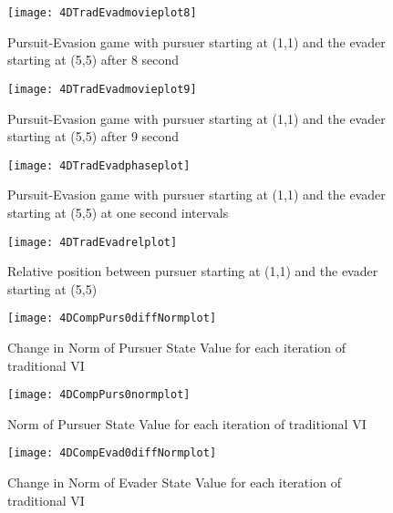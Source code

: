 \begin{figure}
\vspace{2.4in}
\centering
\texttt{[image: 4DTradEvadmovieplot8]}
\caption{Pursuit-Evasion game with pursuer starting at (1,1) and the evader starting at (5,5) after 8 second}
\label{4DTradEvadmovieplot8}
\end{figure}
\clearpage
\newpage

\begin{figure}
\vspace{2.4in}
\centering
\texttt{[image: 4DTradEvadmovieplot9]}
\caption{Pursuit-Evasion game with pursuer starting at (1,1) and the evader starting at (5,5) after 9 second}
\label{4DTradEvadmovieplot9}
\end{figure}
\clearpage
\newpage

\begin{figure}
\vspace{2.4in}
\centering
\texttt{[image: 4DTradEvadphaseplot]}
\caption{Pursuit-Evasion game with pursuer starting at (1,1) and the evader starting at (5,5) at one second intervals}
\label{4DTradEvadphaseplot}
\end{figure}
\clearpage
\newpage

\begin{figure}
\vspace{2.4in}
\centering
\texttt{[image: 4DTradEvadrelplot]}
\caption{Relative position between pursuer starting at (1,1) and the evader starting at (5,5)}
\label{4DTradEvadrelplot}
\end{figure}
\clearpage
\newpage

\begin{figure}
\vspace{2.4in}
\centering
\texttt{[image: 4DCompPurs0diffNormplot]}
\caption{Change in Norm of Pursuer State Value for each iteration of traditional VI}
\label{4DCompPurs0diffNormplot}
\end{figure}
\clearpage
\newpage

\begin{figure}
\vspace{2.4in}
\centering
\texttt{[image: 4DCompPurs0normplot]}
\caption{Norm of Pursuer State Value for each iteration of traditional VI}
\label{4DCompPurs0normplot}
\end{figure}
\clearpage
\newpage

\begin{figure}
\vspace{2.4in}
\centering
\texttt{[image: 4DCompEvad0diffNormplot]}
\caption{Change in Norm of Evader State Value for each iteration of traditional VI}
\label{4DCompEvad0diffNormplot}
\end{figure}
\clearpage
\newpage


